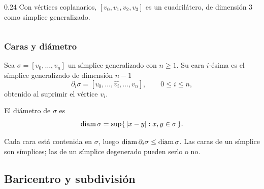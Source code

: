 \begin{frame}
\begin{columns}[T]
\begin{column}{0.24\textwidth}
      \footnotesize
      Con vértices coplanarios, $[v_0,v_1,v_2,v_3]$ es un cuadrilátero, de dimensión $3$
      como símplice generalizado.
    \end{column}
  \end{columns}
\end{frame}

\begin{frame}
  \frametitle{Caras y diámetro}

  \begin{definition}
    Sea $\sigma=[v_0,\ldots,v_n]$ un símplice generalizado con $n\geq1$. Su
    \alert{cara $i$-ésima} es el símplice generalizado de dimensión $n-1$
    \[
      \partial_i\sigma=[v_0,\ldots,\widehat{v_i},\ldots,v_n],
      \qquad 0\leq i\leq n,
    \]
    obtenido al suprimir el vértice $v_i$.

    \medskip

    El \alert{diámetro} de $\sigma$ es
    \[
      \operatorname{diam}\sigma=\sup\{\,|x-y| : x,y\in\sigma\,\}.
    \]
  \end{definition}

  \medskip

  Cada cara está contenida en $\sigma$, luego
  $\operatorname{diam} \partial_i\sigma\leq\operatorname{diam}\sigma$. Las caras de un símplice son símplices;
  las de un símplice degenerado pueden serlo o no.
\end{frame}

\subsection{Baricentro y subdivisión}


